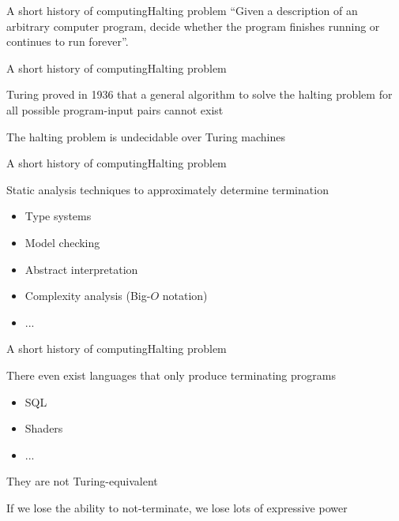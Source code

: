 \documentclass{beamer}
\begin{document}
\begin{textslide}{A short history of computing}{Halting problem}{
``Given a description of an arbitrary computer program, decide whether the program finishes running or continues to run forever''. \cite{HALTING_PROBLEM}
}\end{textslide}

\begin{slide}{A short history of computing}{Halting problem}{
\item Turing proved in 1936 that a general algorithm to solve the halting problem for all possible program-input pairs cannot exist
\item The halting problem is undecidable over Turing machines
}\end{slide}

\begin{slide}{A short history of computing}{Halting problem}{
\item Static analysis techniques to approximately determine termination
\begin{itemize}
\item Type systems \cite{SIMPLY_TYPED_LAMBDA_CALCULUS}
\item Model checking \cite{MODEL_CHECKING}
\item Abstract interpretation \cite{ABSTRACT_INTERPRETATION}
\item Complexity analysis (Big-$O$ notation)
\item ...
\end{itemize}
}\end{slide}

\begin{slide}{A short history of computing}{Halting problem}{
\item There even exist languages that only produce terminating programs
\begin{itemize}
\item SQL
\item Shaders
\item ...
\end{itemize}
\item They are not Turing-equivalent
\item If we lose the ability to not-terminate, we lose lots of expressive power
}\end{slide}
\end{document}
